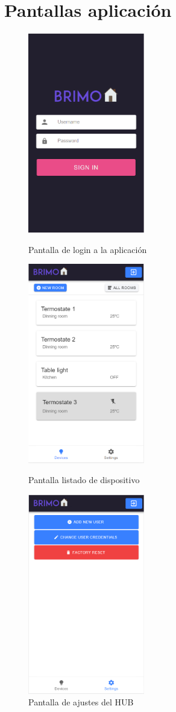 \chapter{Pantallas aplicación}
\label{Anexo:pantallas}
\begin{figure}[!htb]
\includegraphics[width=2.00in]{images/screens/login_screen.PNG}
\caption{Pantalla de login a la aplicación}
\label{fig:pantalla_login}
\endminipage\hfill
{}
\includegraphics[width=2.00in]{images/screens/main_screen.PNG}
\caption{Pantalla listado de dispositivo}
\label{fig:pantalla_main}
\endminipage\hfill
{}%
\includegraphics[width=2.00in]{images/screens/settings_screen.PNG}
\caption{Pantalla de ajustes del HUB}
\label{fig:pantalla_settings}
\endminipage
\end{figure}

